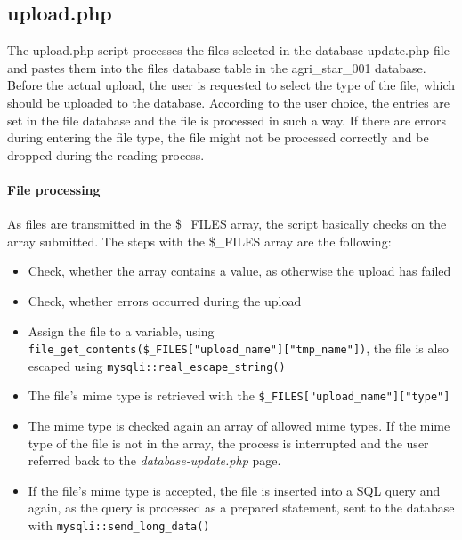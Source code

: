 \subsection{upload.php}
The upload.php script processes the files selected in the database-update.php file and pastes them into the files database table in the agri\_star\_001 database. Before the actual upload, 
the user is requested to select the type of the file, which should be uploaded to the database. According to the user choice, the entries are set in the file database and the file is processed 
in such a way. If there are errors during entering the file type, the file might not be processed correctly and be dropped during the reading process.
\paragraph{File processing}
As files are transmitted in the \$\_FILES array, the script basically checks on the array submitted. The steps with the \$\_FILES array are the following:
\begin{itemize}
 \item Check, whether the array contains a value, as otherwise the upload has failed
 \item Check, whether errors occurred during the upload
 \item Assign the file to a variable, using\\ \texttt{file\_get\_contents(\$\_FILES["upload\_name"]["tmp\_name"])}, the file is also escaped using \texttt{mysqli::real\_escape\_string()}
 \item The file's mime type is retrieved with the \texttt{\$\_FILES["upload\_name"]["type"]}
 \item The mime type is checked again an array of allowed mime types. If the mime type of the file is not in the array, the process is interrupted and the user referred back to the 
 \emph{database-update.php} page.
 \item If the file's mime type is accepted, the file is inserted into a SQL query and again, as the query is processed as a prepared statement, sent to the database with 
 \texttt{mysqli::send\_long\_data()}
\end{itemize}


